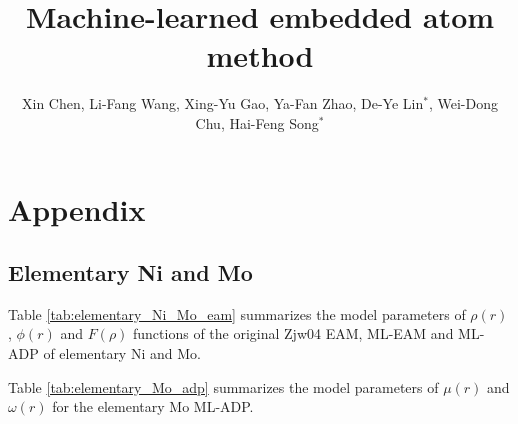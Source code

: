 \documentclass[prb,preprint]{revtex4-2}
\begin{document}
\title{
    Machine-learned embedded atom method
}

\author{Xin Chen, 
        Li-Fang Wang, 
        Xing-Yu Gao,
        Ya-Fan Zhao,
        De-Ye Lin$^\mathrm{*}$, 
        Wei-Dong Chu,
        Hai-Feng Song$^\mathrm{*}$}



\maketitle

% 
%
\section*{Appendix}

% 
%
\subsection{Elementary Ni and Mo}
\label{sec:elementary}

Table \ref{tab:elementary_Ni_Mo_eam} summarizes the model parameters of 
$\rho(r)$, $\phi(r)$ and $F(\rho)$ functions of the original Zjw04 EAM, ML-EAM
and ML-ADP of elementary Ni and Mo.

Table \ref{tab:elementary_Mo_adp} summarizes the model parameters of $\mu(r)$ 
and $\omega(r)$ for the elementary Mo ML-ADP.
\end{document}

